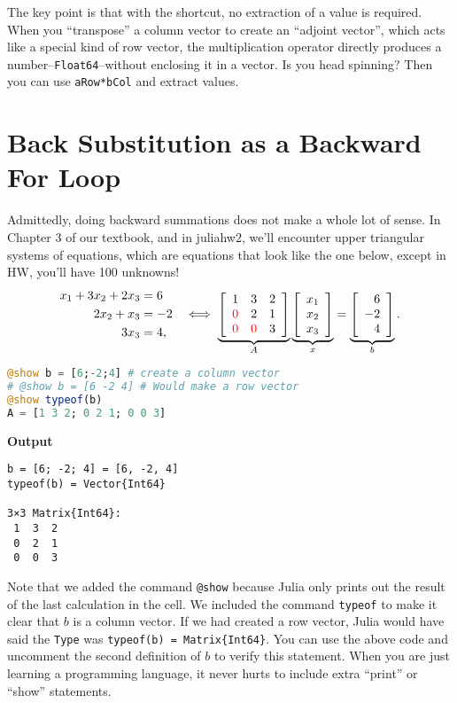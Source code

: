 The key point is that with the shortcut, no extraction of a value is required. When you ``transpose'' a column vector to create an ``adjoint vector'', which acts like a special kind of row vector, the  multiplication operator directly produces a number--\texttt{Float64}--without enclosing it in a vector. Is you head spinning? Then you can use \texttt{aRow*bCol} and extract values.

\section{Back Substitution as a Backward For Loop}
Admittedly, doing  backward summations does not make a whole lot of sense. In Chapter 3 of our textbook, and in juliahw2, we'll encounter upper triangular systems of equations, which are equations that look like the one below, except in HW, you'll have 100 unknowns!  
\begin{equation} 
\label{eq:UT01b}
\begin{array}{cc}
    \begin{aligned}
     x_1 + 3x_2 + 2 x_3 &=6 \\
     2 x_2 +x_3 &= -2\\
     3 x_3 &= 4,
    \end{aligned} & \iff \underbrace{\left[\begin{array}{rrr} 
    1 & 3 & 2\\
\color{red} 0 & 2 & 1 \\ 
\color{red} 0 & \color{red}  0 & 3  \end{array}\right]}_{A}  
\underbrace{\left[\begin{array}{c} x_1 \\x_2 \\x_3\end{array} \right]}_{x}
= \underbrace{\left[\begin{array}{r} 6 \\-2 \\4\end{array} \right]}_{b}.
\end{array}
\end{equation}

\begin{lstlisting}[language=Julia,style=mystyle]
@show b = [6;-2;4] # create a column vector
# @show b = [6 -2 4] # Would make a row vector
@show typeof(b)
A = [1 3 2; 0 2 1; 0 0 3]
\end{lstlisting}
\textbf{Output} 
\begin{verbatim}
b = [6; -2; 4] = [6, -2, 4]
typeof(b) = Vector{Int64}

3×3 Matrix{Int64}:
 1  3  2
 0  2  1
 0  0  3
\end{verbatim}
Note that we added the command \texttt{@show} because Julia only prints out the result of the last calculation in the cell. We included the command \texttt{typeof} to make it clear that $b$ is a column vector. If we had created a row vector, Julia would have said the \texttt{Type} was \texttt{typeof(b) = Matrix\{Int64\}}. You can use the above code and uncomment the second definition of $b$ to verify this statement. When you are just learning a programming language, it never hurts to include extra ``print'' or ``show'' statements.\\

